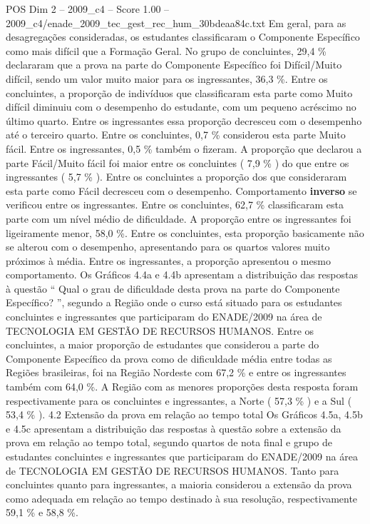 \begin{textsample}{POS Dim 2 – 2009\_c4 – Score 1.00 – 2009\_c4/enade\_2009\_tec\_gest\_rec\_hum\_30bdeaa84c.txt}
Em geral, para as desagregações consideradas, os estudantes classificaram o Componente Específico como mais difícil que a Formação Geral.
No grupo de concluintes, 29,4 \% declararam que a prova na parte do Componente Específico foi Difícil/Muito difícil, sendo um valor muito maior para os ingressantes, 36,3 \%.
Entre os concluintes, a proporção de indivíduos que classificaram esta parte como Muito difícil diminuiu com o desempenho do estudante, com um pequeno acréscimo no último quarto.
Entre os ingressantes essa proporção decresceu com o desempenho até o terceiro quarto.
Entre os concluintes, 0,7 \% considerou esta parte Muito fácil.
Entre os ingressantes, 0,5 \% também o fizeram.
A proporção que declarou a parte Fácil/Muito fácil foi maior entre os concluintes ( 7,9 \% ) do que entre os ingressantes ( 5,7 \% ).
Entre os concluintes a proporção dos que consideraram esta parte como Fácil decresceu com o desempenho.
Comportamento \textbf{inverso} se verificou entre os ingressantes.
Entre os concluintes, 62,7 \% classificaram esta parte com um nível médio de dificuldade.
A proporção entre os ingressantes foi ligeiramente menor, 58,0 \%.
Entre os concluintes, esta proporção basicamente não se alterou com o desempenho, apresentando para os quartos valores muito próximos à média.
Entre os ingressantes, a proporção apresentou o mesmo comportamento.
Os Gráficos 4.4a e 4.4b apresentam a distribuição das respostas à questão “ Qual o grau de dificuldade desta prova na parte do Componente Específico? ”, segundo a Região onde o curso está situado para os estudantes concluintes e ingressantes que participaram do ENADE/2009 na área de TECNOLOGIA EM GESTÃO DE RECURSOS HUMANOS.
Entre os concluintes, a maior proporção de estudantes que considerou a parte do Componente Específico da prova como de dificuldade média entre todas as Regiões brasileiras, foi na Região Nordeste com 67,2 \% e entre os ingressantes também com 64,0 \%.
A Região com as menores proporções desta resposta foram respectivamente para os concluintes e ingressantes, a Norte ( 57,3 \% ) e a Sul ( 53,4 \% ). 4.2 Extensão da prova em relação ao tempo total Os Gráficos 4.5a, 4.5b e 4.5c apresentam a distribuição das respostas à questão sobre a extensão da prova em relação ao tempo total, segundo quartos de nota final e grupo de estudantes concluintes e ingressantes que participaram do ENADE/2009 na área de TECNOLOGIA EM GESTÃO DE RECURSOS HUMANOS.
Tanto para concluintes quanto para ingressantes, a maioria considerou a extensão da prova como adequada em relação ao tempo destinado à sua resolução, respectivamente 59,1 \% e 58,8 \%.

\end{textsample}

